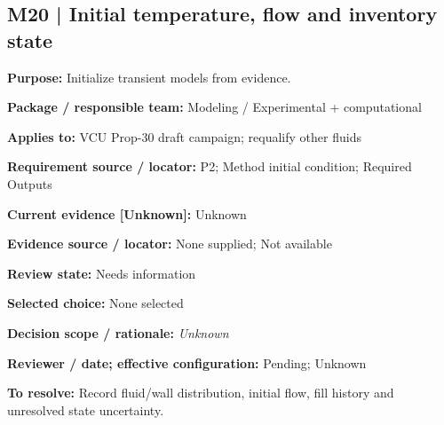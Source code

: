 \documentclass[11pt]{article}
\begin{document}
\par\noindent\begin{minipage}{\textwidth}\small\setlength{\parskip}{2pt}
\subsection*{M20 | Initial temperature, flow and inventory state}
\textbf{Purpose:} Initialize transient models from evidence.\par
\textbf{Package / responsible team:} Modeling / Experimental + computational\par
\textbf{Applies to:} VCU Prop-30 draft campaign; requalify other fluids\par
\textbf{Requirement source / locator:} P2; Method initial condition; Required Outputs\par
\textbf{Current evidence [Unknown]:} Unknown\par
\textbf{Evidence source / locator:} None supplied; Not available\par
\textbf{Review state:} Needs information\par
\textbf{Selected choice:} None selected\par
\textbf{Decision scope / rationale:} \textit{Unknown}\par
\textbf{Reviewer / date; effective configuration:} Pending; Unknown\par
\textbf{To resolve:} Record fluid/wall distribution, initial flow, fill history and unresolved state uncertainty.\par
\end{minipage}\par\vspace{5pt}
\end{document}

